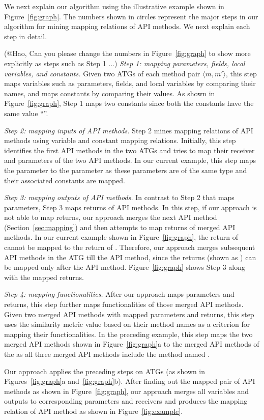 We next explain our algorithm using the illustrative example shown
in Figure~\ref{fig:graph}. The numbers shown in circles
represent the major steps in our algorithm for mining mapping
relations of API methods. We next explain each step in detail.

(@Hao, Can you please change the numbers in Figure~\ref{fig:graph} to show
more explicitly as steps such as Step 1 ...)
\emph{Step 1: mapping parameters, fields, local variables, and constants.}
Given two ATGs of each method pair $\langle m, m' \rangle$, this step maps
variables such as parameters, fields, and local variables by comparing their names,
and maps constants by comparing their values. As shown in
Figure~\ref{fig:graph}, Step 1 maps two constants since both the constants
have the same value ``''.

\emph{Step 2: mapping inputs of API methods.} Step 2 mines mapping
relations of API methods using variable and constant mapping relations.
Initially, this step identifies the first API methods in the two ATGs and tries to
map their receiver and parameters of the two API methods.
In our current example, this step maps the parameter 
to the parameter  as these parameters
are of the same type and their associated constants are mapped.

\emph{Step 3: mapping outputs of API methods.} In contrast to Step 2
that maps parameters, Step 3 maps returns of API methods. In
this step, if our approach is not able to map returns, our
approach merges the next API method (Section~\ref{sec:mapping}) and 
then attempts to map returns of merged API methods. In our current example shown in
Figure~\ref{fig:graph}, the return of  
cannot be mapped to the return of . Therefore, our
approach merges subsequent API methods in the ATG till the 
API method, since the returns (shown as ) can be mapped
only after the  API method. Figure~\ref{fig:graph}
shows Step 3 along with the mapped returns.

\emph{Step 4: mapping functionalities.} After our approach maps
parameters and returns, this step further maps functionalities
of those merged API methods. Given two merged API methods with
mapped parameters and returns, this step uses the similarity
metric value based on their method names as a criterion for mapping
their functionalities. In the preceding example, this step maps the
two merged API methods shown in Figure~\ref{fig:graph}a to the
merged API methods of the  as all
three merged API methods include the method named .

Our approach applies the preceding steps on ATGs (as shown in
Figures~\ref{fig:graph}a and~\ref{fig:graph}b). After finding out
the mapped pair of API methods as shown in Figure~\ref{fig:graph},
our approach merges all variables and outputs to corresponding
parameters and receivers and produces the mapping relation of API
method as shown in Figure~\ref{fig:example}.
